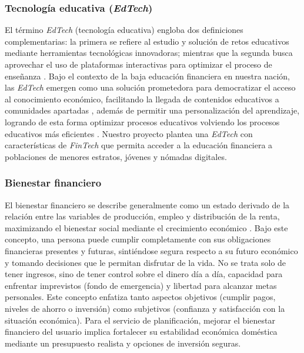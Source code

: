 {}
\subsubsection*{Tecnología educativa (\textit{EdTech})}

El término \textit{EdTech} (tecnología educativa) engloba dos definiciones complementarias: la primera se refiere al estudio y solución de retos educativos mediante herramientas tecnológicas innovadoras; mientras que la segunda busca aprovechar el uso de plataformas interactivas para optimizar el proceso de enseñanza \parencite{UniversidadEuropea01}. Bajo el contexto de la baja educación financiera en nuestra nación, las \textit{EdTech} emergen como una solución prometedora para democratizar el acceso al conocimiento económico, facilitando la llegada de contenidos educativos a comunidades apartadas \parencite{LaSillaVacia01}, además de permitir una personalización del aprendizaje, logrando de esta forma optimizar procesos educativos volviendo los procesos educativos más eficientes \parencite{MundoPosgrado01}. Nuestro proyecto plantea una \textit{EdTech} con características de \textit{FinTech} que permita acceder a la educación financiera a poblaciones de menores estratos, jóvenes y nómadas digitales.

{}
\subsubsection*{Bienestar financiero}

El bienestar financiero se describe generalmente como un estado derivado de la relación entre las variables de producción, empleo y distribución de la renta, maximizando el bienestar social mediante el crecimiento económico \parencite{Economipedia02}. Bajo este concepto, una persona puede cumplir completamente con sus obligaciones financieras presentes y futuras, sintiéndose segura respecto a su futuro económico y tomando decisiones que le permitan disfrutar de la vida. No se trata solo de tener ingresos, sino de tener control sobre el dinero día a día, capacidad para enfrentar imprevistos (fondo de emergencia) y libertad para alcanzar metas personales. Este concepto enfatiza tanto aspectos objetivos (cumplir pagos, niveles de ahorro o inversión) como subjetivos (confianza y satisfacción con la situación económica). Para el servicio de planificación, mejorar el bienestar financiero del usuario implica fortalecer su estabilidad económica doméstica mediante un presupuesto realista y opciones de inversión seguras.

